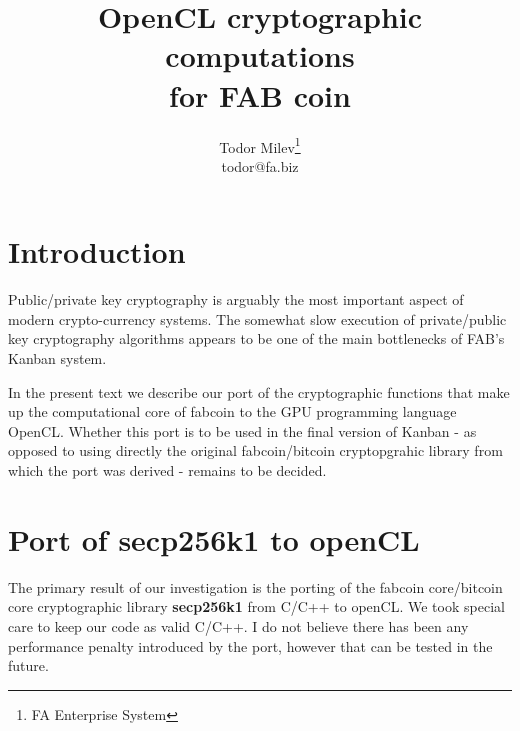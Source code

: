 \documentclass{article}
\title{
OpenCL cryptographic computations \\
for FAB coin
}
\author{Todor Milev\footnote{FA Enterprise System}\\ todor@fa.biz}
\newcommand{\secpTwoFiveSixKone}{{\bf secp256k1}}
\begin{document}
\maketitle
\section{Introduction}
Public/private key cryptography is arguably the most important aspect of modern crypto-currency systems. The somewhat slow execution of private/public key cryptography algorithms appears to be one of the main bottlenecks of FAB's Kanban system. 

In the present text we describe our port of the cryptographic functions that make up the computational core of fabcoin to the GPU programming language OpenCL. Whether this port is to be used in the final version of Kanban - as opposed to using directly the original fabcoin/bitcoin cryptopgrahic library from which the port was derived - remains to be decided.

\section{Port of secp256k1 to openCL}
The primary result of our investigation is the porting of the fabcoin core/bitcoin core cryptographic library \secpTwoFiveSixKone{} from C/C++ to openCL. We took special care to keep our code as valid C/C++. I do not believe there has been any performance penalty introduced by the port, however that can be tested in the future. 
\end{document}
